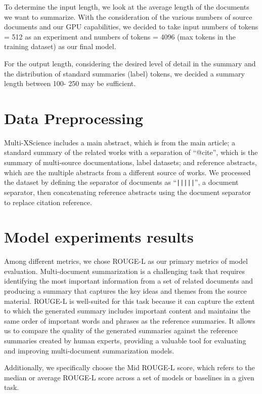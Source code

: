 \documentclass[12pt, twocolumn]{article}
\numberwithin{equation}{section}
\begin{document}
To determine the input length, we look at the average length of the documents we want to summarize. With the consideration of the various numbers of source documents and our GPU capabilities, we decided to take input numbers of tokens = 512 as an experiment and numbers of tokens = 4096 (max tokens in the training dataset) as our final model.

For the output length, considering the desired level of detail in the summary and the distribution of standard summaries (label) tokens, we decided a summary length between 100- 250 may be sufficient.

\section{Data Preprocessing}
\label{sec:dataprocessing}

Multi-XScience includes a main abstract, which is from the main article; a standard summary of the related works with a separation of “@cite”, which is the summary of multi-source documentations, label datasets; and reference abstracts, which are the multiple abstracts from a different source of works. We processed the dataset by defining the separator of documents as ``\texttt{|||||}'', a document separator, then concatenating reference abstracts using the document separator to replace citation reference.

\section{Model experiments results}
\label{sec:results}

Among different metrics, we chose ROUGE-L as our primary metrics of model evaluation. Multi-document summarization is a challenging task that requires identifying the most important information from a set of related documents and producing a summary that captures the key ideas and themes from the source material. ROUGE-L is well-suited for this task because it can capture the extent to which the generated summary includes important content and maintains the same order of important words and phrases as the reference summaries. It allows us to compare the quality of the generated summaries against the reference summaries created by human experts, providing a valuable tool for evaluating and improving multi-document summarization models.

Additionally, we specifically choose the Mid ROUGE-L score, which refers to the median or average ROUGE-L score across a set of models or baselines in a given task.
\end{document}
